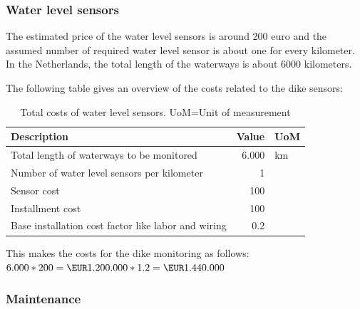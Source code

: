 \subsubsection{Water level sensors}

The estimated price of the water level sensors is around 200 euro and the assumed number of required water level sensor is about one for every kilometer. In the Netherlands, the total length of the waterways is about $6000$ kilometers\cite{cbs-waterways}.

The following table gives an overview of the costs related to the dike sensors:

\begin{table}[H]

	\centering
	\begin{tabular}{lrl}
	\toprule
	\textbf{Description} & \multicolumn{1}{l}{\textbf{Value}} & \textbf{UoM} \\ \hline
	Total length of waterways to be monitored & $6.000$ & km \\
	Number of water level sensors per kilometer & 1 & \\
	Sensor cost & 100 & \EUR{} \\
	Installment cost & 100 &\EUR{} \\
	Base installation cost factor like labor and wiring & 0.2 & \\
	\bottomrule
	\end{tabular}
	\label{table:total-dev-costs3} 
	\caption{Total costs of water level sensors. UoM=Unit of measurement}
\end{table}

This makes the costs for the dike monitoring as follows: \\
$ 6.000 * 200 = \EUR1.200.000 * 1.2 = \EUR1.440.000$\\

\subsubsection{Maintenance}


